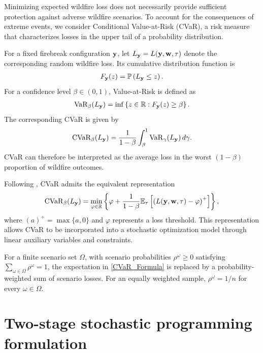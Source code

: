 \documentclass{itor}
\begin{document}
Minimizing expected wildfire loss does not necessarily
provide sufficient protection against adverse wildfire
scenarios. To account for the consequences of extreme
events, we consider Conditional Value-at-Risk (CVaR),
a risk measure that characterizes losses in the upper
tail of a probability distribution.

For a fixed firebreak configuration $\vb{y}$,
let $L_{\vb{y}}=L(\vb{y},\vb{w},\tau)$ denote
the corresponding random wildfire loss.
Its cumulative distribution function is
\begin{align}
F_{\vb{y}}(z)
=
\mathbb{P}
\left(
L_{\vb{y}}\leq z
\right).
\end{align}
For a confidence level $\beta\in(0,1)$,
Value-at-Risk is defined as
\begin{align}
\operatorname{VaR}_{\beta}(L_{\vb{y}})
=
\inf\left\{
z\in\mathbb{R}:
F_{\vb{y}}(z)\geq\beta
\right\}.
\end{align}
The corresponding CVaR is given by
\begin{align}
\operatorname{CVaR}_{\beta}(L_{\vb{y}})
=
\frac{1}{1-\beta}
\int_{\beta}^{1}
\operatorname{VaR}_{\gamma}(L_{\vb{y}})
\,d\gamma.
\end{align}
CVaR can therefore be interpreted as the average
loss in the worst $(1-\beta)$ proportion of
wildfire outcomes.

Following \citet{rockafellar2000optimization},
CVaR admits the equivalent representation
\begin{equation}
\label{CVaR_Formula}
\operatorname{CVaR}_{\beta}(L_{\vb{y}})
=
\min_{\varphi\in\mathbb{R}}
\left\{
\varphi+
\frac{1}{1-\beta}
\mathbb{E}_{\tau}
\left[
\left(
L(\vb{y},\vb{w},\tau)-\varphi
\right)^+
\right]
\right\},
\end{equation}
where $(a)^+=\max\{a,0\}$ and $\varphi$
represents a loss threshold. This representation
allows CVaR to be incorporated into a stochastic
optimization model through linear auxiliary
variables and constraints.

For a finite scenario set $\Omega$, with
scenario probabilities $\rho^\omega\geq 0$
satisfying
$\sum_{\omega\in\Omega}\rho^\omega=1$,
the expectation in
\eqref{CVaR_Formula} is replaced by a
probability-weighted sum of scenario losses.
For an equally weighted sample,
$\rho^\omega=1/n$ for every
$\omega\in\Omega$.


    


\section{Two-stage stochastic programming formulation}
\label{s:general-model}
\end{document}
